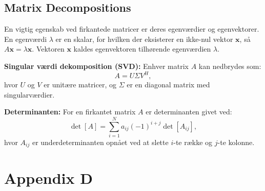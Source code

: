 \documentclass[a4paper,12pt]{book}
\begin{document}
	\section{Matrix Decompositions}
	En vigtig egenskab ved firkantede matricer er deres egenværdier og egenvektorer. En egenværdi \(\lambda\) er en skalar, for hvilken der eksisterer en ikke-nul vektor \(\mathbf{x}\), så \(A\mathbf{x} = \lambda\mathbf{x}\). Vektoren \(\mathbf{x}\) kaldes egenvektoren tilhørende egenværdien \(\lambda\).
	
	\textbf{Singular værdi dekomposition (SVD):} Enhver matrix \(A\) kan nedbrydes som:
	\[
	A = U\Sigma V^H,
	\]
	hvor \(U\) og \(V\) er unitære matricer, og \(\Sigma\) er en diagonal matrix med singularværdier.
	
	\textbf{Determinanten:} For en firkantet matrix \(A\) er determinanten givet ved:
	\[
	\det[A] = \sum_{i=1}^{N} a_{ij} (-1)^{i+j} \det[A_{ij}],
	\]
	hvor \(A_{ij}\) er underdeterminanten opnået ved at slette \(i\)-te række og \(j\)-te kolonne.
	
	\chapter{Appendix D}
	
\end{document}

